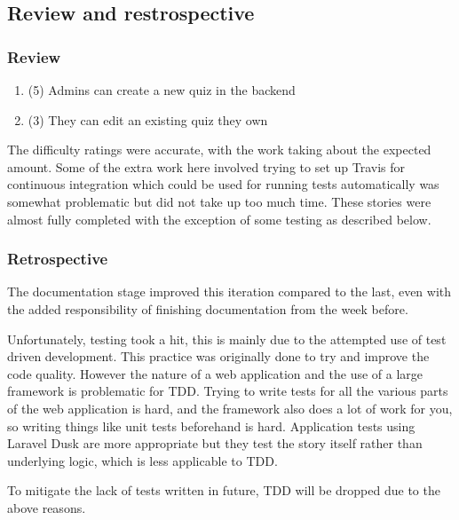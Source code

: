 \subsection{Review and restrospective}
\subsubsection{Review}
\begin{enumerate}
	\item (5) Admins can create a new quiz in the backend
	\item (3) They can edit an existing quiz they own
\end{enumerate}
The difficulty ratings were accurate, with the work taking about the expected amount. Some of the extra work here involved trying to set up Travis for continuous integration which could be used for running tests automatically was somewhat problematic but did not take up too much time. These stories were almost fully completed with the exception of some testing as described below.

\subsubsection{Retrospective}
The documentation stage improved this iteration compared to the last, even with the added responsibility of finishing documentation from the week before.

Unfortunately, testing took a hit, this is mainly due to the attempted use of test driven development. This practice was originally done to try and improve the code quality. However the nature of a web application and the use of a large framework is problematic for TDD. Trying to write tests for all the various parts of the web application is hard, and the framework also does a lot of work for you, so writing things like unit tests beforehand is hard. Application tests using Laravel Dusk are more appropriate but they test the story itself rather than underlying logic, which is less applicable to TDD. 

To mitigate the lack of tests written in future, TDD will be dropped due to the above reasons.
\newpage

